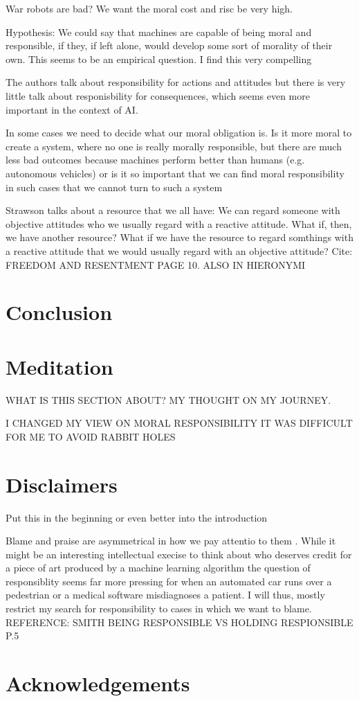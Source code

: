 \documentclass{article}
\begin{document}
War robots are bad? We want the moral cost and risc be very high.

Hypothesis: We could say that machines are capable of being moral and
responsible, if they, if left alone, would develop some sort of morality of
their own. This seems to be an empirical question. I find this very compelling

The authors talk about responsibility for actions and attitudes but there is
very little talk about responisbility for consequences, which seems even more
important in the context of AI.

In some cases we need to decide what our moral obligation is. Is it more moral
to create a system, where no one is really morally responsible, but there are
much less bad outcomes because machines perform better than humans (e.g.
autonomous vehicles) or is it so important that we can find moral responsibility
in such cases that we cannot turn to such a system

Strawson talks about a resource that we all have: We can regard someone with
objective attitudes who we usually regard with a reactive attitude. What if,
then, we have another resource? What if we have the resource to regard somthings
with a reactive attitude that we would usually regard with an objective
attitude? Cite: FREEDOM AND RESENTMENT PAGE 10. ALSO IN HIERONYMI
\section{Conclusion}
\section{Meditation}
WHAT IS THIS SECTION ABOUT?
MY THOUGHT ON MY JOURNEY.

I CHANGED MY VIEW ON MORAL RESPONSIBILITY
IT WAS DIFFICULT FOR ME TO AVOID RABBIT HOLES
\section{Disclaimers}
Put this in the beginning or even better into the introduction

Blame and praise are asymmetrical in how we pay attentio to them . While it
might be an interesting intellectual execise to think about who deserves credit
for a piece of art produced by a machine learning algorithm the question of
responsiblity seems far more pressing for when an automated car runs over a
pedestrian or a medical software misdiagnoses a patient. I will thus, mostly
restrict my search for responsibility to cases in which we want to blame.
REFERENCE: SMITH BEING RESPONSIBLE VS HOLDING RESPIONSIBLE P.5
\section{Acknowledgements}
\clearpage

\printglossary[type=\acronymtype]
\printglossary
\printbibliography
\end{document}
